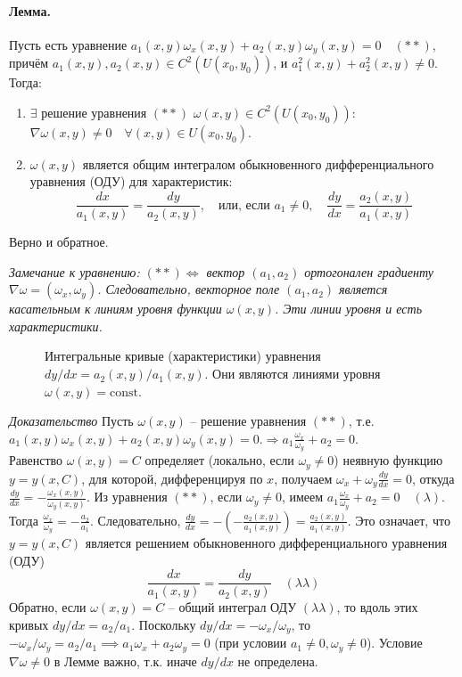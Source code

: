 \documentclass[12pt, a4paper]{article}
\begin{document}
\paragraph{Лемма.}
Пусть есть уравнение $a_1(x,y)\omega_x(x,y) + a_2(x,y)\omega_y(x,y) = 0 \quad (**)$, причём $a_1(x,y), a_2(x,y) \in C^2(U(x_0,y_0))$, и $a_1^2(x,y) + a_2^2(x,y) \neq 0$.
\newline Тогда:
\begin{enumerate}
    \item $\exists$ решение уравнения $(**)$ $\omega(x,y) \in C^2(U(x_0,y_0))$: $\nabla \omega(x,y) \neq 0 \quad \forall (x,y) \in U(x_0,y_0)$.
    \item $\omega(x,y)$ является общим интегралом обыкновенного дифференциального уравнения (ОДУ) для характеристик:
    \[ \frac{dx}{a_1(x,y)} = \frac{dy}{a_2(x,y)}, \quad \text{или, если } a_1 \neq 0, \quad \frac{dy}{dx} = \frac{a_2(x,y)}{a_1(x,y)} \]
\end{enumerate}
Верно и обратное.

\textit{Замечание к уравнению: $(**)\Leftrightarrow$ вектор $(a_1, a_2)$ ортогонален градиенту $\nabla \omega = (\omega_x, \omega_y)$. Следовательно, векторное поле $(a_1, a_2)$ является касательным к линиям уровня функции $\omega(x,y)$. Эти линии уровня и есть характеристики.}

\begin{figure}[h!]
\centering
\caption{Интегральные кривые (характеристики) уравнения $dy/dx = a_2(x,y)/a_1(x,y)$. Они являются линиями уровня $\omega(x,y)=\text{const}$.}
\end{figure}

\textit{Доказательство}
\newline
Пусть $\omega(x,y)$ -- решение уравнения $(**)$, т.е. $a_1(x,y)\omega_x(x,y) + a_2(x,y)\omega_y(x,y) = 0. \Rightarrow a_1\frac{\omega_x}{\omega_y} +a_2 = 0 $.
\\
Равенство $\omega(x,y)=C$ определяет (локально, если $\omega_y \neq 0$) неявную функцию $y=y(x,C)$, для которой, дифференцируя по $x$, получаем $\omega_x + \omega_y \frac{dy}{dx} = 0$, откуда $\frac{dy}{dx} = -\frac{\omega_x(x,y)}{\omega_y(x,y)}$.
Из уравнения $(**)$, если $\omega_y \neq 0$, имеем $a_1 \frac{\omega_x}{\omega_y} + a_2 = 0 \quad (\lambda)$.
Тогда $\frac{\omega_x}{\omega_y} = -\frac{a_2}{a_1}$.
Следовательно, $\frac{dy}{dx} = - \left(-\frac{a_2(x,y)}{a_1(x,y)}\right) = \frac{a_2(x,y)}{a_1(x,y)}$.
Это означает, что $y=y(x,C)$ является решением обыкновенного дифференциального уравнения (ОДУ)
\[ \frac{dx}{a_1(x,y)} = \frac{dy}{a_2(x,y)} \quad (\lambda\lambda) \]
Обратно, если $\omega(x,y)=C$ -- общий интеграл ОДУ $(\lambda\lambda)$, то вдоль этих кривых $dy/dx = a_2/a_1$.
Поскольку $dy/dx = -\omega_x/\omega_y$, то $-\omega_x/\omega_y = a_2/a_1 \implies a_1\omega_x + a_2\omega_y = 0$ (при условии $a_1 \neq 0, \omega_y \neq 0$).
Условие $\nabla \omega \neq 0$ в Лемме важно, т.к. иначе $dy/dx$ не определена.
\end{document}
